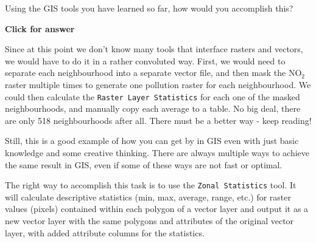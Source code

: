 \documentclass[
  letterpaper,
  DIV=11,
  numbers=noendperiod]{scrreprt}
\begin{document}
\begin{tcolorbox}[enhanced jigsaw, coltitle=black, toprule=.15mm, breakable, opacitybacktitle=0.6, left=2mm, colback=white, leftrule=.75mm, rightrule=.15mm, colbacktitle=quarto-callout-important-color!10!white, toptitle=1mm, titlerule=0mm, colframe=quarto-callout-important-color-frame, arc=.35mm, bottomtitle=1mm, opacityback=0, bottomrule=.15mm, title=\textcolor{quarto-callout-important-color}{\faExclamation}\hspace{0.5em}{Stop and Think}]

Using the GIS tools you have learned so far, how would you accomplish
this?

\end{tcolorbox}

\begin{tcolorbox}[enhanced jigsaw, toprule=.15mm, breakable, left=2mm, colframe=quarto-callout-important-color-frame, colback=white, arc=.35mm, leftrule=.75mm, opacityback=0, rightrule=.15mm, bottomrule=.15mm]

\vspace{-3mm}\textbf{Click for answer}\vspace{3mm}

Since at this point we don't know many tools that interface rasters and
vectors, we would have to do it in a rather convoluted way. First, we
would need to separate each neighbourhood into a separate vector file,
and then mask the NO\(_2\) raster multiple times to generate one
pollution raster for each neighbourhood. We could then calculate the
\texttt{Raster\ Layer\ Statistics} for each one of the masked
neighbourhoods, and manually copy each average to a table. No big deal,
there are only 518 neighbourhoods after all. There must be a better way
- keep reading!

Still, this is a good example of how you can get by in GIS even with
just basic knowledge and some creative thinking. There are always
multiple ways to achieve the same result in GIS, even if some of these
ways are not fast or optimal.

\end{tcolorbox}

The right way to accomplish this task is to use the
\texttt{Zonal\ Statistics} tool. It will calculate descriptive
statistics (min, max, average, range, etc.) for raster values (pixels)
contained within each polygon of a vector layer and output it as a new
vector layer with the same polygons and attributes of the original
vector layer, with added attribute columns for the statistics.
\end{document}
